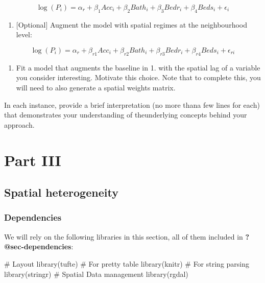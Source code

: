 \documentclass[
  letterpaper,
  krantz2]{style/krantz}
\newenvironment{Shaded}{\begin{snugshade}}{\end{snugshade}}
\newcommand{\CommentTok}[1]{\textcolor[rgb]{0.37,0.37,0.37}{#1}}
\newcommand{\FunctionTok}[1]{\textcolor[rgb]{0.28,0.35,0.67}{#1}}
\newcommand{\NormalTok}[1]{\textcolor[rgb]{0.00,0.23,0.31}{#1}}
\providecommand{\tightlist}{%
  \setlength{\itemsep}{0pt}\setlength{\parskip}{0pt}}\usepackage{longtable,booktabs,array}
\begin{document}
\[
\log(P_i) = \alpha_r + \beta_1 Acc_i + \beta_2 Bath_i + \beta_3 Bedr_i + \beta_4 Beds_i + \epsilon_i
\]

\begin{enumerate}
\def\labelenumi{\arabic{enumi}.}
\setcounter{enumi}{2}
\tightlist
\item
  {[}Optional{]} Augment the model with spatial regimes at the
  neighbourhood level:
\end{enumerate}

\[
\log(P_i) = \alpha_r + \beta_{r1} Acc_i + \beta_{r2} Bath_i + \beta_{r3} Bedr_i + \beta_{r4} Beds_i + \epsilon_{ri}
\]

\begin{enumerate}
\def\labelenumi{\arabic{enumi}.}
\setcounter{enumi}{3}
\tightlist
\item
  Fit a model that augments the baseline in 1. with the spatial lag of a
  variable you consider interesting. Motivate this choice. Note that to
  complete this, you will need to also generate a spatial weights
  matrix.
\end{enumerate}

In each instance, provide a brief interpretation (no more thana few
lines for each) that demonstrates your understanding of theunderlying
concepts behind your approach.

\part{Part III}

\hypertarget{spatial-heterogeneity-1}{%
\chapter{Spatial heterogeneity}\label{spatial-heterogeneity-1}}

\hypertarget{dependencies-4}{%
\section{Dependencies}\label{dependencies-4}}

We will rely on the following libraries in this section, all of them
included in \textbf{?@sec-dependencies}:

\begin{Shaded}
\begin{Highlighting}[]
\CommentTok{\# Layout}
\FunctionTok{library}\NormalTok{(tufte)}
\CommentTok{\# For pretty table}
\FunctionTok{library}\NormalTok{(knitr)}
\CommentTok{\# For string parsing}
\FunctionTok{library}\NormalTok{(stringr)}
\CommentTok{\# Spatial Data management}
\FunctionTok{library}\NormalTok{(rgdal)}
\end{Highlighting}
\end{Shaded}
\end{document}
